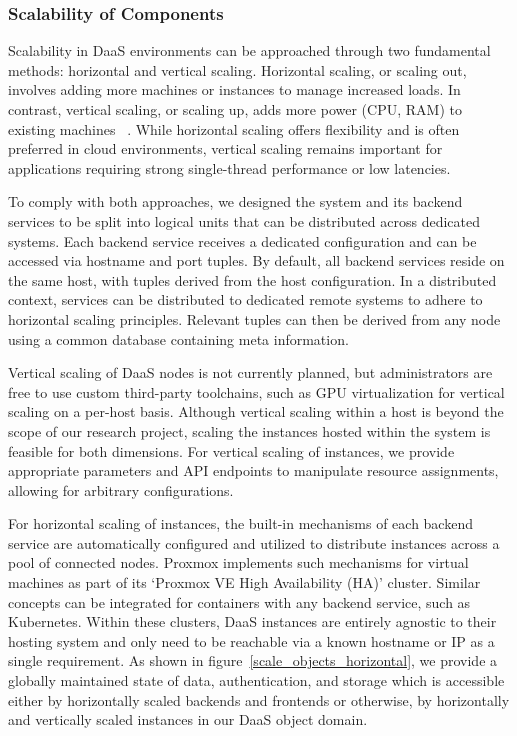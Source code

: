 \documentclass[runningheads]{llncs}
\begin{document}
\subsubsection{Scalability of Components}

Scalability in DaaS environments
can be approached through two fundamental methods: horizontal and vertical scaling.
Horizontal scaling, or scaling out, involves adding more machines or instances
to manage increased loads.
In contrast, vertical scaling, or scaling up,
adds more power (CPU, RAM) to existing machines
~\cite{vaquero2011dynamically}.
While horizontal scaling offers flexibility
and is often preferred in cloud environments,
vertical scaling remains important for applications
requiring strong single-thread performance or low latencies.

To comply with both approaches,
we designed the system and its backend services
to be split into logical units that can be distributed across dedicated systems.
Each backend service receives a dedicated configuration
and can be accessed via hostname and port tuples.
By default, all backend services reside on the same host,
with tuples derived from the host configuration.
In a distributed context, services can be distributed to dedicated remote systems
to adhere to horizontal scaling principles.
Relevant tuples can then be derived from any node
using a common database containing meta information.

Vertical scaling of DaaS nodes is not currently planned,
but administrators are free to use custom third-party toolchains,
such as GPU virtualization for vertical scaling on a per-host basis.
Although vertical scaling within a host
is beyond the scope of our research project,
scaling the instances hosted within the system is feasible for both dimensions.
For vertical scaling of instances, we provide appropriate parameters
and API endpoints to manipulate resource assignments,
allowing for arbitrary configurations.

For horizontal scaling of instances, the built-in mechanisms
of each backend service are automatically configured
and utilized to distribute instances across a pool of connected nodes.
Proxmox implements such mechanisms
for virtual machines as part of its `Proxmox VE High Availability (HA)' cluster.
Similar concepts can be integrated for containers with any backend service,
such as Kubernetes.
Within these clusters,
DaaS instances are entirely agnostic to their hosting system
and only need to be reachable
via a known hostname or IP as a single requirement.
As shown in figure~\ref{scale_objects_horizontal},
we provide a globally maintained state of data, authentication, and storage
which is accessible either by horizontally scaled backends and frontends
or otherwise,
by horizontally and vertically scaled instances in our DaaS object domain.
\end{document}
